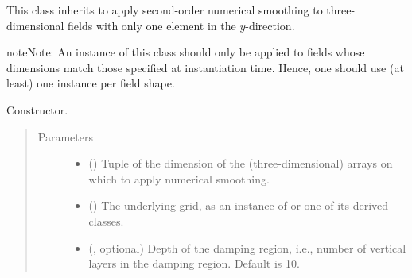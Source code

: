 \documentclass[letterpaper,10pt,english]{sphinxmanual}
\begin{document}
\begin{fulllineitems}
\label{\detokenize{api:tasmania.dycore.horizontal_smoothing.HorizontalSmoothingSecondOrderXZ}}
This class inherits {\hyperref[\detokenize{api:tasmania.dycore.horizontal_smoothing.HorizontalSmoothing}]{}} to apply second-order
numerical smoothing to three-dimensional fields with only one element in the \(y\)-direction.

\begin{sphinxadmonition}{note}{Note:}
An instance of this class should only be applied to fields whose dimensions match those specified at instantiation time.
Hence, one should use (at least) one instance per field shape.
\end{sphinxadmonition}

\begin{fulllineitems}
\label{\detokenize{api:tasmania.dycore.horizontal_smoothing.HorizontalSmoothingSecondOrderXZ.__init__}}
Constructor.
\begin{quote}\begin{description}
\item[{Parameters}] \leavevmode\begin{itemize}
\item {} 
 () \textendash{} Tuple of the dimension of the (three-dimensional) arrays on which to apply numerical smoothing.

\item {} 
 () \textendash{} The underlying grid, as an instance of {\hyperref[\detokenize{api:tasmania.grids.grid_xyz.GridXYZ}]{}} or one of its derived classes.

\item {} 
 (, optional) \textendash{} Depth of the damping region, i.e., number of vertical layers in the damping region. Default is 10.


\end{itemize}
\end{description}
\end{quote}
\end{fulllineitems}
\end{fulllineitems}
\end{document}
